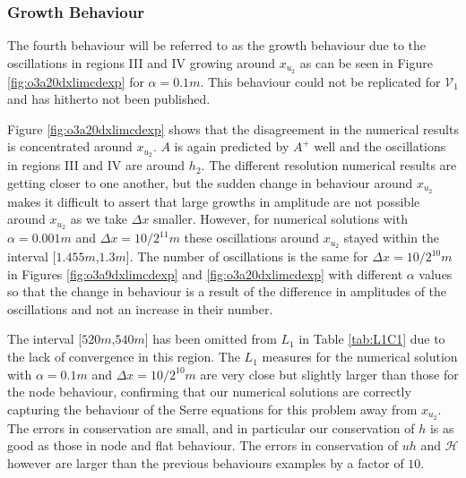 \documentclass[times]{elsarticle}
\begin{document}
\subsubsection{Growth Behaviour}
The fourth behaviour will be referred to as the growth behaviour due to the oscillations in regions III and IV growing around $x_{u_2}$ as can be seen in Figure \ref{fig:o3a20dxlimcdexp} for $\alpha = 0.1m$. This behaviour could not be replicated for $\mathcal{V}_1$ and has hitherto not been published. 

Figure \ref{fig:o3a20dxlimcdexp} shows that the disagreement in the numerical results is concentrated around $x_{u_2}$. $A$ is again predicted by $A^+$ well and the oscillations in regions III and IV are around $h_2$. The different resolution numerical results are getting closer to one another, but the sudden change in behaviour around $x_{u_2}$ makes it difficult to assert that large growths in amplitude are not possible around $x_{u_2}$ as we take $\Delta x$ smaller. However, for numerical solutions with $\alpha = 0.001m$ and $\Delta x = 10 / 2^{11}m$ these oscillations around $x_{u_2}$ stayed within the interval [$1.455m$,$1.3m$]. The number of oscillations is the same for $\Delta x = 10 / 2^{10}m$ in Figures \ref{fig:o3a9dxlimcdexp} and \ref{fig:o3a20dxlimcdexp} with different $\alpha$ values so that the change in behaviour is a result of the difference in amplitudes of the oscillations and not an increase in their number.

The interval [$520m$,$540m$] has been omitted from $L_1$ in Table \ref{tab:L1C1} due to the lack of convergence in this region. The $L_1$ measures for the numerical solution with $\alpha = 0.1m$ and $\Delta x = 10/2^{10}m$ are very close but slightly larger than those for the node behaviour, confirming that our numerical solutions are correctly capturing the behaviour of the Serre equations for this problem away from $x_{u_2}$. The errors in conservation are small, and in particular our conservation of $h$ is as good as those in node and flat behaviour. The errors in conservation of $uh$ and $\mathcal{H}$ however are larger than the previous behaviours examples by a factor of $10$.
\end{document}
